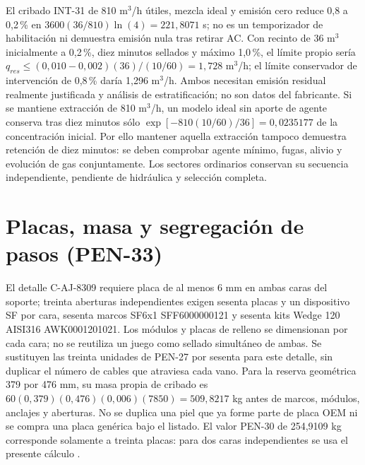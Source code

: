 El cribado INT-31 de 810 m$^3$/h útiles, mezcla ideal y emisión cero reduce 0,8 a 0,2\,\% en $3600(36/810)\ln(4)=221,8071$ s; no es un temporizador de habilitación ni demuestra emisión nula tras retirar AC. Con recinto de 36 m$^3$ inicialmente a 0,2\,\%, diez minutos sellados y máximo 1,0\,\%, el límite propio sería $q_{res}\leq(0,010-0,002)(36)/(10/60)=1,728$ m$^3$/h; el límite conservador de intervención de 0,8\,\% daría 1,296 m$^3$/h. Ambos necesitan emisión residual realmente justificada y análisis de estratificación; no son datos del fabricante. Si se mantiene extracción de 810 m$^3$/h, un modelo ideal sin aporte de agente conserva tras diez minutos sólo $\exp[-810(10/60)/36]=0,0235177$ de la concentración inicial. Por ello mantener aquella extracción tampoco demuestra retención de diez minutos: se deben comprobar agente mínimo, fugas, alivio y evolución de gas conjuntamente. Los sectores ordinarios conservan su secuencia independiente, pendiente de hidráulica y selección completa.

\section{Placas, masa y segregación de pasos (PEN-33)}
\label{sec:sd4-pen33}
El detalle C-AJ-8309 requiere placa de al menos 6 mm en ambas caras del soporte; treinta aberturas independientes exigen sesenta placas y un dispositivo SF por cara, sesenta marcos SF6x1 SFF6000000121 y sesenta kits Wedge 120 AISI316 AWK0001201021. Los módulos y placas de relleno se dimensionan por cada cara; no se reutiliza un juego como sellado simultáneo de ambas. Se sustituyen las treinta unidades de PEN-27 por sesenta para este detalle, sin duplicar el número de cables que atraviesa cada vano. Para la reserva geométrica 379 por 476 mm, su masa propia de cribado es $60(0,379)(0,476)(0,006)(7850)=509,8217$ kg antes de marcos, módulos, anclajes y aberturas. No se duplica una piel que ya forme parte de placa OEM ni se compra una placa genérica bajo el listado. El valor PEN-30 de 254,9109 kg corresponde solamente a treinta placas: para dos caras independientes se usa el presente cálculo \parencite[pp.~1--4]{lote30-caj8309}.

